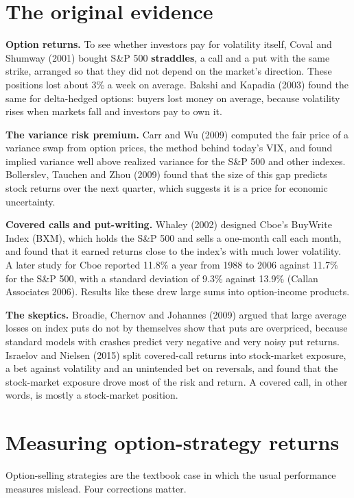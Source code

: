 \section{The original evidence}
\label{sec:16-evidence}

\textbf{Option returns.} To see whether investors pay for volatility itself, Coval and Shumway (2001) bought S\&P 500 \textbf{straddles}, a call and a put with the same strike, arranged so that they did not depend on the market's direction. These positions lost about 3\% a week on average. Bakshi and Kapadia (2003) found the same for delta-hedged options: buyers lost money on average, because volatility rises when markets fall and investors pay to own it.

\textbf{The variance risk premium.} Carr and Wu (2009) computed the fair price of a variance swap from option prices, the method behind today's VIX, and found implied variance well above realized variance for the S\&P 500 and other indexes. Bollerslev, Tauchen and Zhou (2009) found that the size of this gap predicts stock returns over the next quarter, which suggests it is a price for economic uncertainty.

\textbf{Covered calls and put-writing.} Whaley (2002) designed Cboe's BuyWrite Index (BXM), which holds the S\&P 500 and sells a one-month call each month, and found that it earned returns close to the index's with much lower volatility. A later study for Cboe reported 11.8\% a year from 1988 to 2006 against 11.7\% for the S\&P 500, with a standard deviation of 9.3\% against 13.9\% (Callan Associates 2006). Results like these drew large sums into option-income products.

\textbf{The skeptics.} Broadie, Chernov and Johannes (2009) argued that large average losses on index puts do not by themselves show that puts are overpriced, because standard models with crashes predict very negative and very noisy put returns. Israelov and Nielsen (2015) split covered-call returns into stock-market exposure, a bet against volatility and an unintended bet on reversals, and found that the stock-market exposure drove most of the risk and return. A covered call, in other words, is mostly a stock-market position.

\section{Measuring option-strategy returns}
\label{sec:16-measure}

Option-selling strategies are the textbook case in which the usual performance measures mislead. Four corrections matter.

